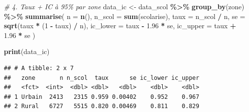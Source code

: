 \documentclass[
]{article}
\newenvironment{Shaded}{\begin{snugshade}}{\end{snugshade}}
\newcommand{\AttributeTok}[1]{\textcolor[rgb]{0.13,0.29,0.53}{#1}}
\newcommand{\CommentTok}[1]{\textcolor[rgb]{0.56,0.35,0.01}{\textit{#1}}}
\newcommand{\DecValTok}[1]{\textcolor[rgb]{0.00,0.00,0.81}{#1}}
\newcommand{\FloatTok}[1]{\textcolor[rgb]{0.00,0.00,0.81}{#1}}
\newcommand{\FunctionTok}[1]{\textcolor[rgb]{0.13,0.29,0.53}{\textbf{#1}}}
\newcommand{\NormalTok}[1]{#1}
\newcommand{\OtherTok}[1]{\textcolor[rgb]{0.56,0.35,0.01}{#1}}
\newcommand{\SpecialCharTok}[1]{\textcolor[rgb]{0.81,0.36,0.00}{\textbf{#1}}}
\begin{document}
\begin{Shaded}
\begin{Highlighting}[]
\CommentTok{\# 4. Taux + IC à 95\% par zone}
\NormalTok{data\_ic }\OtherTok{\textless{}{-}}\NormalTok{ data\_scol }\SpecialCharTok{\%\textgreater{}\%}
  \FunctionTok{group\_by}\NormalTok{(zone) }\SpecialCharTok{\%\textgreater{}\%}
  \FunctionTok{summarise}\NormalTok{(}
    \AttributeTok{n        =} \FunctionTok{n}\NormalTok{(),}
    \AttributeTok{n\_scol   =} \FunctionTok{sum}\NormalTok{(scolarise),}
    \AttributeTok{taux     =}\NormalTok{ n\_scol }\SpecialCharTok{/}\NormalTok{ n,}
    \AttributeTok{se       =} \FunctionTok{sqrt}\NormalTok{(taux }\SpecialCharTok{*}\NormalTok{ (}\DecValTok{1} \SpecialCharTok{{-}}\NormalTok{ taux) }\SpecialCharTok{/}\NormalTok{ n),}
    \AttributeTok{ic\_lower =}\NormalTok{ taux }\SpecialCharTok{{-}} \FloatTok{1.96} \SpecialCharTok{*}\NormalTok{ se,}
    \AttributeTok{ic\_upper =}\NormalTok{ taux }\SpecialCharTok{+} \FloatTok{1.96} \SpecialCharTok{*}\NormalTok{ se}
\NormalTok{  )}

\FunctionTok{print}\NormalTok{(data\_ic)}
\end{Highlighting}
\end{Shaded}

\begin{verbatim}
## # A tibble: 2 x 7
##   zone       n n_scol  taux      se ic_lower ic_upper
##   <fct>  <int>  <dbl> <dbl>   <dbl>    <dbl>    <dbl>
## 1 Urbain  2413   2315 0.959 0.00402    0.952    0.967
## 2 Rural   6727   5515 0.820 0.00469    0.811    0.829
\end{verbatim}
\end{document}
